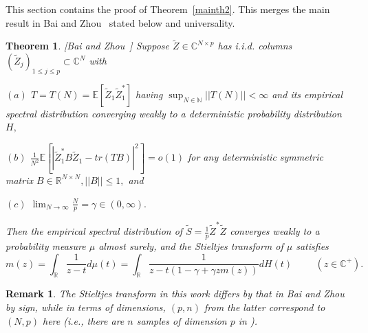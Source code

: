\documentclass{article}
\newtheorem{theorem}{Theorem}
\newtheorem*{remark}{Remark}
\numberwithin{equation}{section}
\begin{document}
This section contains the proof of Theorem~\ref{mainth2}. This merges the main result in Bai and Zhou~\cite{baizhou} stated below and universality. 


\begin{theorem}\label{baizhouth}
    [Bai and Zhou~\cite{baizhou}] Suppose \(\tilde{Z} \in \mathbb{C}^{N \times p}\) has i.i.d. columns \((\tilde{Z}_j)_{1 \leq j \leq p} \subset \mathbb{C}^N\) with
    \par
    \((a)\) \(T=T(N)=\mathbb{E}[\tilde{Z}_1\tilde{Z}_1^*]\) having \(\sup_{N \in \mathbb{N}}{||T(N)||}<\infty\) and its empirical spectral distribution converging weakly to a deterministic probability distribution \(H,\) 
    \par
    \((b)\) \(\frac{1}{N^2}\mathbb{E}[|\tilde{Z}_1^{*}B\tilde{Z}_1-tr(TB)|^2]=o(1)\) for any deterministic symmetric matrix \(B \in \mathbb{R}^{N \times N},||B|| \leq 1,\) and
    \par
    \((c)\) \(\lim_{N \to \infty}{\frac{N}{p}}=\gamma \in (0,\infty).\) 
    \par
    Then the empirical spectral distribution of \(\tilde{S}=\frac{1}{p}\tilde{Z}^*\tilde{Z}\) converges weakly to a probability measure \(\mu\) almost surely, and the Stieltjes transform of \(\mu\) satisfies 
    \[m(z)=\int_{\mathbb{R}}{\frac{1}{z-t}d\mu(t)}=\int_{\mathbb{R}}{\frac{1}{z-t(1-\gamma+\gamma z m(z))}dH(t)} \hspace{1cm} (z \in \mathbb{C}^+).\]
\end{theorem}

\begin{remark}
The Stieltjes transform in this work differs by that in Bai and Zhou~\cite{baizhou} by sign, while in terms of dimensions, \((p,n)\) from the latter correspond to \((N,p)\) here (i.e., there are \(n\) samples of dimension \(p\) in \cite{baizhou}).
\end{remark}
\end{document}
